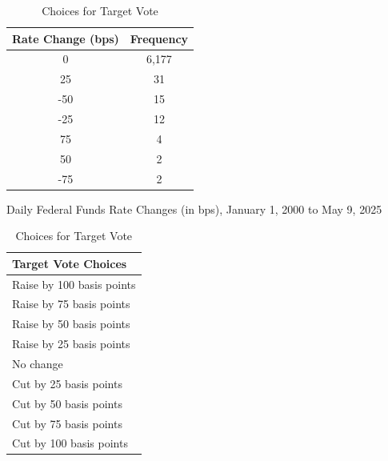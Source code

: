 \begin{table}[htbp]
    \centering
    \footnotesize
    \begin{minipage}[t]{0.48\textwidth}
        \centering
        \begin{tabular}{c c}
            \toprule
            Rate Change (bps) & Frequency \\
            \midrule
            0    & 6,177 \\
            25   & 31 \\
            -50  & 15 \\
            -25  & 12 \\
            75   & 4 \\
            50   & 2 \\
            -75  & 2 \\
            \bottomrule
        \end{tabular}
        \caption{Daily Federal Funds Rate Changes (in bps), January 1, 2000 to May 9, 2025}
        \label{tab:ch2:ffr_changes}
    \end{minipage}
    \hfill
    \begin{minipage}[t]{0.48\textwidth}
        \centering
        \begin{tabular}{l}
            \toprule
            Target Vote Choices \\
            \midrule
            Raise by 100 basis points \\
            Raise by 75 basis points \\
            Raise by 50 basis points \\
            Raise by 25 basis points \\
            No change \\
            Cut by 25 basis points \\
            Cut by 50 basis points \\
            Cut by 75 basis points \\
            Cut by 100 basis points \\
            \bottomrule
        \end{tabular}
        \caption{Choices for Target Vote}
        \label{tab:ch2:vote_choice}
    \end{minipage}
\end{table}


